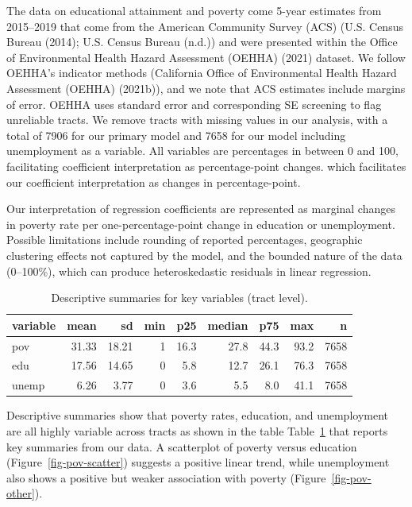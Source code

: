 \documentclass[
  letterpaper,
  DIV=11,
  numbers=noendperiod]{scrartcl}
\begin{document}
The data on educational attainment and poverty come 5-year estimates
from 2015--2019 that come from the American Community Survey (ACS) (U.S.
Census Bureau (2014); U.S. Census Bureau (n.d.)) and were presented
within the Office of Environmental Health Hazard Assessment (OEHHA)
(2021) dataset. We follow OEHHA's indicator methods (California Office
of Environmental Health Hazard Assessment (OEHHA) (2021b)), and we note
that ACS estimates include margins of error. OEHHA uses standard error
and corresponding SE screening to flag unreliable tracts. We remove
tracts with missing values in our analysis, with a total of 7906 for our
primary model and 7658 for our model including unemployment as a
variable. All variables are percentages in between 0 and 100,
facilitating coefficient interpretation as percentage-point changes.
which facilitates our coefficient interpretation as changes in
percentage-point.

Our interpretation of regression coefficients are represented as
marginal changes in poverty rate per one-percentage-point change in
education or unemployment. Possible limitations include rounding of
reported percentages, geographic clustering effects not captured by the
model, and the bounded nature of the data (0--100\%), which can produce
heteroskedastic residuals in linear regression.

\begin{longtable}[]{@{}lrrrrrrrr@{}}

\caption{\label{tbl-summ}Descriptive summaries for key variables (tract
level).}

\tabularnewline

\toprule\noalign{}
variable & mean & sd & min & p25 & median & p75 & max & n \\
\midrule\noalign{}
\endhead
\bottomrule\noalign{}
\endlastfoot
pov & 31.33 & 18.21 & 1 & 16.3 & 27.8 & 44.3 & 93.2 & 7658 \\
edu & 17.56 & 14.65 & 0 & 5.8 & 12.7 & 26.1 & 76.3 & 7658 \\
unemp & 6.26 & 3.77 & 0 & 3.6 & 5.5 & 8.0 & 41.1 & 7658 \\

\end{longtable}

Descriptive summaries show that poverty rates, education, and
unemployment are all highly variable across tracts as shown in the table
Table~\ref{tbl-summ} that reports key summaries from our data. A
scatterplot of poverty versus education (Figure~\ref{fig-pov-scatter})
suggests a positive linear trend, while unemployment also shows a
positive but weaker association with poverty
(Figure~\ref{fig-pov-other}).
\end{document}
